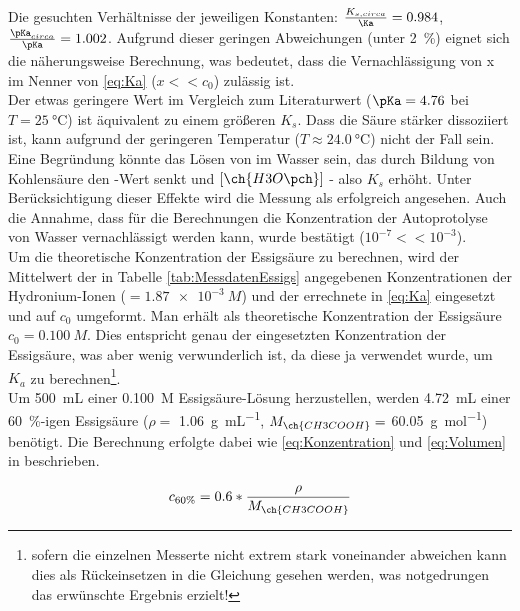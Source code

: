 \documentclass{article}
\begin{document}
         Die gesuchten Verhältnisse der jeweiligen Konstanten: $\frac{K_{s,circa}}{\Ka} = 0.984$, $\frac{\pKa _{circa}}{\pKa} = 1.002$. Aufgrund dieser geringen Abweichungen (unter \SI[mode=text]{2}{\percent}) eignet sich die näherungsweise Berechnung, was bedeutet, dass die Vernachlässigung von x im Nenner von \eqref{eq:Ka} ($x << c_{0}$) zulässig ist. \\
         
         Der etwas geringere Wert im Vergleich zum Literaturwert ($\pKa = 4.76$ bei $T = \SI[mode=text]{25}{\degreeCelsius}$) ist äquivalent zu einem größeren $K_{s}$. Dass die Säure stärker dissoziiert ist, kann aufgrund der geringeren Temperatur ($T \approx \SI[mode=text]{24.0}{\degreeCelsius}$) nicht der Fall sein. Eine Begründung könnte das Lösen von  im Wasser sein, das durch Bildung von Kohlensäure den \pH-Wert senkt und $[\ch{H3O\pch}]$ - also $K_{s}$ erhöht. Unter Berücksichtigung dieser Effekte wird die Messung als erfolgreich angesehen. Auch die Annahme, dass für die Berechnungen die  Konzentration der Autoprotolyse von Wasser vernachlässigt werden kann, wurde bestätigt ($10^{-7} << 10^{-3}$). \\
         
         Um die theoretische Konzentration der Essigsäure zu berechnen, wird der Mittelwert der in Tabelle \ref{tab:MessdatenEssigs} angegebenen Konzentrationen der Hydronium-Ionen ($= \SI[mode=text]{1.87e-3}{M}$) und der errechnete \Ka in \eqref{eq:Ka} eingesetzt und auf $c_{0}$ umgeformt. Man erhält als theoretische Konzentration der Essigsäure $c_{0} = \SI[mode=text]{0.100}{M}$. Dies entspricht genau der eingesetzten Konzentration der Essigsäure, was aber wenig verwunderlich ist, da diese ja verwendet wurde, um $K_{a}$ zu berechnen\footnote{sofern die einzelnen Messerte nicht extrem stark voneinander abweichen kann dies als Rückeinsetzen in die Gleichung gesehen werden, was notgedrungen das erwünschte Ergebnis erzielt!}. \\
         
         Um \SI[mode=text]{500}{\milli\liter} einer \SI[mode=text]{0.100}{M} Essigsäure-Lösung herzustellen, werden \SI[mode=text]{4.72}{\milli\liter} einer \SI[mode=text]{60}{\percent}-igen Essigsäure ($\rho = $ \SI[mode=text]{1.06}{\gram\per\milli\liter}, $M_{\ch{CH3COOH}} = $ \SI[mode=text]{60.05}{\g\per\mole}) benötigt. Die Berechnung erfolgte dabei wie \eqref{eq:Konzentration} und \eqref{eq:Volumen} in beschrieben.
       
         \begin{equation}
           c_{60\%} = 0.6 * \frac{\rho}{M_{\ch{CH3COOH}}}  \label{eq:Konzentration}
         \end{equation}
       
\end{document}
